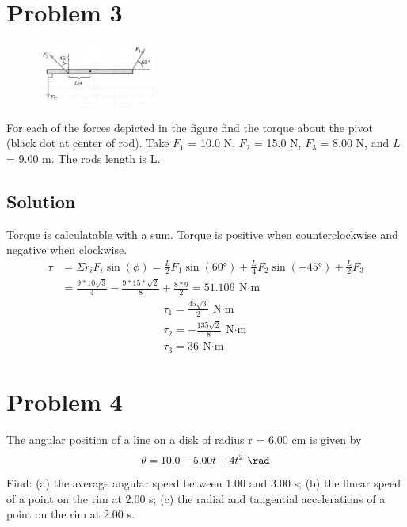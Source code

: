 \documentclass[12pt]{article}
\begin{document}
\pagebreak
\section*{Problem 3}
\begin{figure}
    \vspace{-30pt}
    \includegraphics[width=0.35\textwidth]{graph_3.png} 
\end{figure}
For each of the forces depicted in the figure find the torque about the pivot (black dot at
center of rod). Take $F_1$ = 10.0 N, $F_2$ = 15.0 N, $F_3$ = 8.00 N, and $L$ = 9.00 m. The 
rods length is L.

\subsection*{Solution}
Torque is calculatable with a sum. Torque is positive when counterclockwise and negative when clockwise.
\begin{align*}
    \tau    &=   \Sigma r_i F_i \sin(\phi)
        =   \frac{L}{2} F_1 \sin(60\unit{\degree}) + \frac{L}{4} F_2 \sin(-45\unit{\degree}) + \frac{L}{2} F_3\\
        &=  \frac{9*10\sqrt{3}}{4} - \frac{9*15*\sqrt{2}}{8} + \frac{8*9}{2}
        =   51.106\ \unit{\newton\cdot\meter}
\end{align*}
\begin{eqnarray*}
    \boxed{\tau_1 = \frac{45\sqrt{3}}{2}\ \unit{\newton\cdot\meter}}\\
    \boxed{\tau_2 = -\frac{135\sqrt{2}}{8}\ \unit{\newton\cdot\meter}}\\
    \boxed{\tau_3 = 36\ \unit{\newton\cdot\meter}}
\end{eqnarray*}

\pagebreak
\section*{Problem 4}
The angular position of a line on a disk of radius r = 6.00 cm is given by
\[ \theta = 10.0 - 5.00 t + 4 t^2\ \unit{\rad} \]
Find: (a) the average angular speed between 1.00 and 3.00 s; (b) the linear speed of a point on
the rim at 2.00 s; (c) the radial and tangential accelerations of a point on the rim at 2.00 s.
\end{document}
